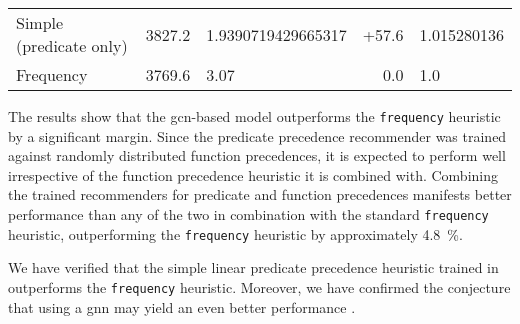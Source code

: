 \begin{table*}[h]
\begin{tabular}{l|ll|rl}
Simple (predicate only) &
\num{3827.2} &
\num[round-mode=places,round-precision=2]{1.9390719429665317} &
+57.6 &
\num[round-mode=places,round-precision=3]{1.015280136} \\




Frequency &
\num{3769.6} &
\num{3.07} &
0.0 &
\num[round-mode=places,round-precision=3]{1.0} \\

\end{tabular}
\end{table*}


The results show that the \gls{gcn}-based model outperforms the \texttt{frequency} heuristic by a significant margin.
Since the predicate precedence recommender was trained against randomly distributed function precedences,
it is expected to perform well irrespective of the function precedence heuristic it is combined with.
Combining the trained recommenders for predicate and function precedences manifests better performance
than any of the two in combination with the standard \texttt{frequency} heuristic,
outperforming the \texttt{frequency} heuristic by approximately \SI{4.8}{\percent}.

We have verified that the simple linear predicate precedence heuristic
trained in \cite{DBLP:conf/cade/Bartek020} outperforms the \texttt{frequency} heuristic.
Moreover, we have confirmed the conjecture that using a \gls{gnn} may yield an even better performance \cite{DBLP:conf/cade/Bartek020}.

